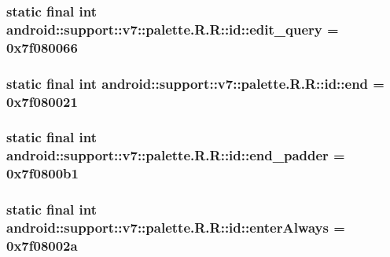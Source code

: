 \hypertarget{classandroid_1_1support_1_1v7_1_1palette_1_1_r_1_1id_22637a86251643bac273e7401ede3ee4}{
\subsubsection[{edit\_\-query}]{\setlength{\rightskip}{0pt plus 5cm}static final int android::support::v7::palette.R.R::id::edit\_\-query = 0x7f080066}}
\label{classandroid_1_1support_1_1v7_1_1palette_1_1_r_1_1id_22637a86251643bac273e7401ede3ee4}


\hypertarget{classandroid_1_1support_1_1v7_1_1palette_1_1_r_1_1id_5a606a429e30ec96c428089a01395983}{
\subsubsection[{end}]{\setlength{\rightskip}{0pt plus 5cm}static final int android::support::v7::palette.R.R::id::end = 0x7f080021}}
\label{classandroid_1_1support_1_1v7_1_1palette_1_1_r_1_1id_5a606a429e30ec96c428089a01395983}


\hypertarget{classandroid_1_1support_1_1v7_1_1palette_1_1_r_1_1id_197e8627cac047e589b09fb1fd84dcaf}{
\subsubsection[{end\_\-padder}]{\setlength{\rightskip}{0pt plus 5cm}static final int android::support::v7::palette.R.R::id::end\_\-padder = 0x7f0800b1}}
\label{classandroid_1_1support_1_1v7_1_1palette_1_1_r_1_1id_197e8627cac047e589b09fb1fd84dcaf}


\hypertarget{classandroid_1_1support_1_1v7_1_1palette_1_1_r_1_1id_8534e8dbd5018090e7144782f17d19cc}{
\subsubsection[{enterAlways}]{\setlength{\rightskip}{0pt plus 5cm}static final int android::support::v7::palette.R.R::id::enterAlways = 0x7f08002a}}
\label{classandroid_1_1support_1_1v7_1_1palette_1_1_r_1_1id_8534e8dbd5018090e7144782f17d19cc}


